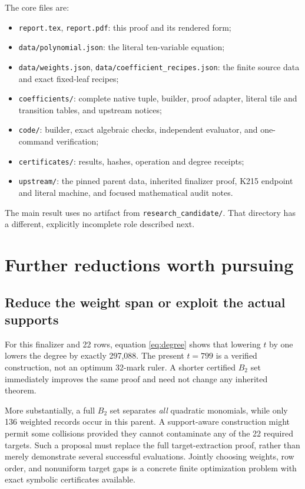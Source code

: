 \documentclass[11pt]{article}
\newcommand{\file}[1]{\nolinkurl{#1}}
\theoremstyle{definition}
\theoremstyle{remark}
\numberwithin{equation}{section}
\begin{document}
The core files are:
\begin{itemize}
\item \file{report.tex}, \file{report.pdf}: this proof and its rendered form;
\item \file{data/polynomial.json}: the literal ten-variable equation;
\item \file{data/weights.json}, \file{data/coefficient_recipes.json}:
the finite source data and exact fixed-leaf recipes;
\item \file{coefficients/}: complete native tuple, builder, proof adapter,
literal tile and transition tables, and upstream notices;
\item \file{code/}: builder, exact algebraic checks, independent evaluator,
and one-command verification;
\item \file{certificates/}: results, hashes, operation and degree receipts;
\item \file{upstream/}: the pinned parent data, inherited finalizer proof,
K215 endpoint and literal machine, and focused mathematical audit notes.
\end{itemize}
The main result uses no artifact from \file{research_candidate/}.
That directory has a different, explicitly incomplete role described next.

\section{Further reductions worth pursuing}
\label{sec:future}

\subsection{Reduce the weight span or exploit the actual supports}

For this finalizer and 22 rows, equation \eqref{eq:degree} shows that
lowering \(t\) by one lowers the degree by exactly 297,088.
The present \(t=799\) is a verified construction, not an optimum
32-mark ruler. A shorter certified \(B_2\) set immediately improves the
same proof and need not change any inherited theorem.

More substantially, a full \(B_2\) set separates \emph{all} quadratic
monomials, while only 136 weighted records occur in this parent.
A support-aware construction might permit some collisions provided
they cannot contaminate any of the 22 required targets. Such a proposal
must replace the full target-extraction proof, rather than merely
demonstrate several successful evaluations. Jointly choosing weights,
row order, and nonuniform target gaps is a concrete finite optimization
problem with exact symbolic certificates available.
\end{document}
